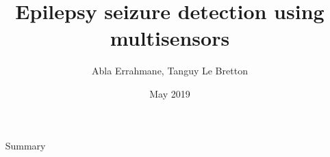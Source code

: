 \documentclass[12pt]{article}
\title{Epilepsy seizure detection using multisensors}
\author{Abla Errahmane, Tanguy Le Bretton}
\date{May 2019}
\begin{document}
\maketitle

\newpage
~
\newpage
Summary
\end{document}
